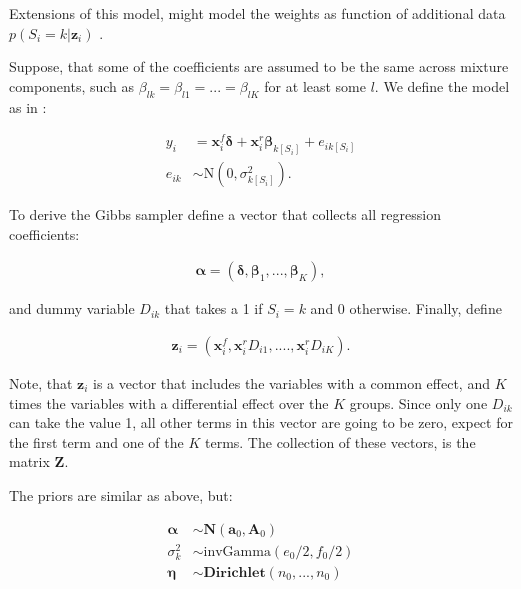 \documentclass[11pt,a4paper]{article}
\begin{document}
Extensions of this model, might model the weights as function of additional data $p(S_i=k|\mathbf{z}_i)$ \citep[p. 274]{FruehwirthSchnatter.2006}.







Suppose, that some of the coefficients are assumed to be the same across mixture components, such as $\beta_{lk} = \beta_{l1} = ... = \beta_{lK}$ for at least some $l$. We define the model as in \citet[p. 257]{FruehwirthSchnatter.2006}: 

\begin{equation*}
\begin{split}
y_i &= \mathbf{x}_i^f \bm{\delta} + \mathbf{x}_i^r \bm{\beta}_{k[S_i]} + e_{ik[S_i]} \\
e_{ik} &\sim \mathrm{N}(0,\sigma^2_{k[S_i]}). 
\end{split}
\end{equation*}

To derive the Gibbs sampler define a vector that collects all regression coefficients: 

\begin{equation*}
\begin{split}
\bm{\alpha} = (\bm{\delta}, \bm{\beta}_1, ..., \bm{\beta}_K), 
\end{split}
\end{equation*}

and dummy variable $D_{ik}$ that takes a 1 if $S_i=k$ and 0 otherwise. Finally, define 

\begin{equation*}
\begin{split}
\mathbf{z}_i = (\mathbf{x}_i^f, \mathbf{x}_i^r D_{i1}, ...., \mathbf{x}_i^r D_{iK}). 
\end{split}
\end{equation*}

Note, that $\mathbf{z}_i$ is a vector that includes the variables with a common effect, and $K$ times the variables with a differential effect over the $K$ groups. Since only one $D_{ik}$ can take the value 1, all other terms in this vector are going to be zero, expect for the first term and one of the $K$ terms. The collection of these vectors, is the matrix $\mathbf{Z}$. 

The priors are similar as above, but: 

\begin{equation*}
\begin{split}
\boldsymbol{\alpha} &\sim \mathrm{\mathbf{N}}(\textbf{a}_0, \textbf{A}_0) \\
\sigma^2_k &\sim \mathrm{invGamma}(e_0/2, f_0/2) \\
\bm{\eta} &\sim \mathrm{\mathbf{Dirichlet}}(n_0, ..., n_0)
\end{split}
\end{equation*}
\end{document}
